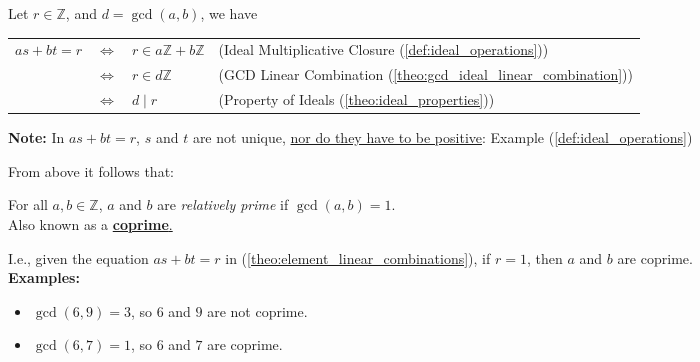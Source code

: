 \begin{Proof}

    Let $r\in\mathbb{Z}$, and $d=\gcd(a,b)$, we have
    
    \begin{center}
        \setlength{\tabcolsep}{4pt} %
\renewcommand{\arraystretch}{1.2} %

        \begin{tabular}{p{2cm} p{1cm} p{2cm} p{5.5cm}}
            $as + bt = r$ & $\Longleftrightarrow$ & $r \in a\mathbb{Z} + b\mathbb{Z}$ & (Ideal Multiplicative Closure (\ref{def:ideal_operations})) \\
            & $\Longleftrightarrow$ & $r \in d\mathbb{Z}$ & (GCD Linear Combination (\ref{theo:gcd_ideal_linear_combination})) \\
            & $\Longleftrightarrow$ & $d \mid r$ & (Property of Ideals (\ref{theo:ideal_properties})) \\
        \end{tabular}
    \end{center}
\end{Proof}
\begin{Note}
    \textbf{Note:} In $as + bt = r$, $s$ and $t$ are not unique, \underline{nor do they have to be positive}: Example (\ref{def:ideal_operations})
\end{Note}

\noindent
From above it follows that:

\begin{Def}

    \label{def:relatively_prime}

    For all \(a, b \in \mathbb{Z}\), \(a\) and \(b\) are \textit{relatively prime} if \(\gcd(a, b) = 1\).\\
    
    \noindent
    Also known as a \underline{\textbf{coprime}.}

\end{Def}
I.e., given the equation $as + bt = r$ in (\ref{theo:element_linear_combinations}), if $r=1$, then $a$ and $b$ are coprime.\\

\textbf{Examples:}
\begin{itemize}
    \item $\gcd(6,9)=3$, so $6$ and $9$ are not coprime.
    \item $\gcd(6,7)=1$, so $6$ and $7$ are coprime.
\end{itemize}

